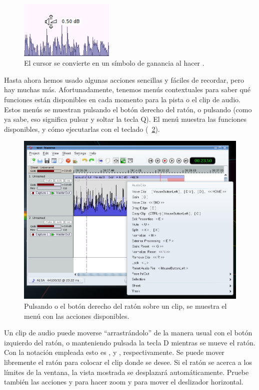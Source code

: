 \begin{figure}
 \centering\includegraphics[width=0.4\textwidth]{../images/gain-cursor.png}
 \caption{El cursor se convierte en un símbolo de ganancia al hacer .}
 \label{fig_gaincursor}
\end{figure}

Hasta ahora hemos usado algunas acciones sencillas y fáciles de recordar, pero hay muchas más. Afortunadamente, tenemos menús contextuales para saber qué funciones están disponibles en cada momento para la pista o el clip de audio. Estos menús se muestran pulsando el botón derecho del ratón, o pulsando   (como ya sabe, eso significa pulsar y soltar la tecla Q). El menú muestra las funciones disponibles, y cómo ejecutarlas con el teclado (\FigB\ \ref{fig_clipmenu}).

\begin{figure}
 \centering\includegraphics[width=\textwidth]{../images/clipmenu.png}
 \caption{Pulsando  o el botón derecho del ratón sobre un clip, se muestra el menú con las acciones disponibles.}
 \label{fig_clipmenu}
\end{figure}

Un clip de audio puede moverse ``arrastrándolo'' de la manera usual con el botón izquierdo del ratón, o manteniendo pulsada la tecla D mientras se mueve el ratón. Con la notación empleada esto es , y , respectivamente. Se puede mover libremente el ratón para colocar el clip donde se desee. Si el ratón se acerca a los límites de la ventana, la vista mostrada se desplazará automáticamente. Pruebe también las acciones  y  para hacer zoom y para mover el deslizador horizontal.

